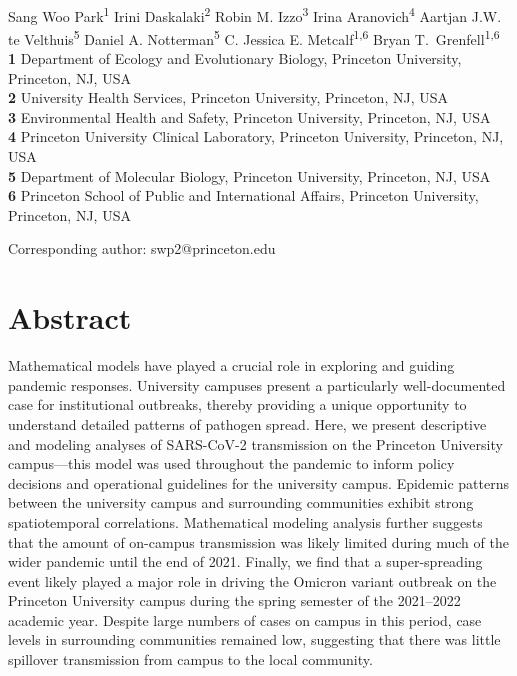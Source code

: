 \documentclass[12pt]{article}
\date{\today}
\begin{document}
\begin{flushleft}{
	\Large
	\textbf{}
}
\newline
\\
Sang Woo Park\textsuperscript{1}
Irini Daskalaki\textsuperscript{2}
Robin M. Izzo\textsuperscript{3}
Irina Aranovich\textsuperscript{4}
Aartjan J.W. te Velthuis\textsuperscript{5}
Daniel A. Notterman\textsuperscript{5}
C. Jessica E. Metcalf\textsuperscript{1,6}
Bryan T.\ Grenfell\textsuperscript{1,6}
\\
\bigskip
\textbf{1} Department of Ecology and Evolutionary Biology, Princeton University, Princeton, NJ, USA
\\
\textbf{2} University Health Services, Princeton University, Princeton, NJ, USA
\\
\textbf{3} Environmental Health and Safety, Princeton University, Princeton, NJ, USA
\\
\textbf{4} Princeton University Clinical Laboratory, Princeton University, Princeton, NJ, USA
\\
\textbf{5} Department of Molecular Biology, Princeton University, Princeton, NJ, USA
\\
\textbf{6} Princeton School of Public and International Affairs, Princeton University, Princeton, NJ, USA
\\
\bigskip

Corresponding author: swp2@princeton.edu
\bigskip
\end{flushleft}

\section*{Abstract}

Mathematical models have played a crucial role in exploring and guiding pandemic responses. 
University campuses present a particularly well-documented case for institutional outbreaks, thereby providing a unique opportunity to understand detailed patterns of pathogen spread.
Here, we present descriptive and modeling analyses of SARS-CoV-2 transmission on the Princeton University campus---this model was used throughout the pandemic to inform policy decisions and operational guidelines for the university campus.
Epidemic patterns between the university campus and surrounding communities exhibit strong spatiotemporal correlations.
Mathematical modeling analysis further suggests that the amount of on-campus transmission was likely limited during much of the wider pandemic until the end of 2021.
Finally, we find that a super-spreading event likely played a major role in driving the Omicron variant outbreak on the Princeton University campus during the spring semester of the 2021--2022 academic year.
Despite large numbers of cases on campus in this period, case levels in surrounding communities remained low, suggesting that there was little spillover transmission from campus to the local community.
\end{document}
